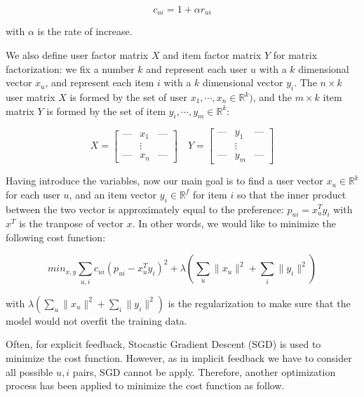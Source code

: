 \begin{displaymath}
c_{ui} = 1 + \alpha r_{ui}
\end{displaymath}

\noindent with \( \alpha\) is the rate of increase. 

We also define user factor matrix \(X\) and item factor matrix \(Y\) for matrix factorization: we fix a number \(k\) and represent each user \(u\) with a \(k\) dimensional vector \(x_u\), and represent each item \(i\) with a \(k\) dimensional vector \(y_i\). The \(n \times k \) user matrix \(X\) is formed by the set of user \(x_1, \cdots, x_n \in \mathbb{R}^k) \), and the \(m \times k \) item matrix \(Y\) is formed by the set of item \(y_i, \cdots, y_m \in \mathbb{R}^k \):
 
\[
X = \begin{bmatrix}
\mbox{---} & x_1 & \mbox{---} \\
 & \vdots & \\ 
\mbox{---} & x_n & \mbox{---}
\end{bmatrix} \quad
Y = 
\begin{bmatrix}
\mbox{---} & y_1& \mbox{---} \\
 & \vdots & \\ 
\mbox{---} & y_m& \mbox{---}
\end{bmatrix}
\]

Having introduce the variables, now our main goal is to find a user vector \(x_u \in \mathbb{R}^k \) for each user \(u\), and an item vector \(y_i \in \mathbb{R}^f \) for item \(i\) so that the inner product between the two vector is approximately equal to the preference: \(p_{ui} = x^T_u y_i \) with \(x^T\) is the tranpose of vector \(x\). In other words, we would like to minimize the following cost function:

\begin{displaymath}
min_{x, y} \sum_{u,i} c_{ui} (p_{ui} - x^T_u y_i)^2 + \lambda \left(\sum_u \lVert x_u \rVert^2 + \sum_i \lVert y_i \rVert ^2 \right) \tag{1} \label{eq:1}
\end{displaymath}

with \( \lambda \left(\sum_u \lVert x_u \rVert^2 + \sum_i \lVert y_i \rVert ^2 \right)\) is the regularization to make sure that the model would not overfit the training data. 

Often, for explicit feedback, Stocastic Gradient Descent (SGD) is used to minimize the cost function. However, as in implicit feedback we have to consider all possible \(u, i\) pairs, SGD cannot be apply. Therefore, another optimization process has been applied to minimize the cost function as follow.

